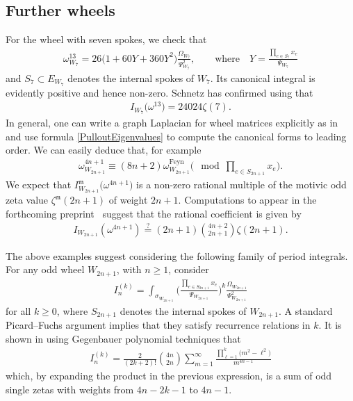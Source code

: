 \documentclass[pdftex]{sigma}%
\numberwithin{equation}{section}
\newcommand{\mm}{\mathfrak{m}}
\newcommand{\0}{\color{blue}{\mathsf{0}}}
\begin{document}
\subsection{Further wheels}
 For the wheel with seven spokes,
we check that
\begin{gather*}
\omega^{13}_{W_7} = 26 \big(1 + 60 Y+ 360 Y^2 \big) \frac{\Omega_{W_7}}{\Psi_{W_7}^2}, \qquad \text{where}\quad Y= \frac{\prod_{e\in S_7} x_e }{\Psi_{W_7}}
\end{gather*}
 and $S_7\subset E_{W_7}$ denotes the internal spokes of $W_7$. Its canonical integral is evidently positive and hence non-zero.
Schnetz has confirmed using \cite{BorinskySchnetz} that
\begin{gather*}
I_{W_7}\big(\omega^{13}\big)= 24024\zeta(7).
\end{gather*}
 In general, one can write a graph Laplacian for wheel matrices explicitly as in \cite[formula~(11.3)]{BEK} and use formula \eqref{PulloutEigenvalues} to compute the canonical forms to leading order. We can easily deduce that, for example
\begin{gather*}
\omega^{4n+1}_{W_{2n+1}} \equiv (8n+2) \omega^{\mathrm{Feyn}}_{W_{2n+1}}
\bigg(\!\!\!\!\!\mod \prod_{e \in S_{2n+1} }x_e \bigg) .
\end{gather*}
We expect that $I^{\mm}_{W_{2n+1}}\big(\omega^{4n+1}\big)$ is a non-zero rational multiple of the motivic odd zeta value $\zeta^{\mathfrak{m}}(2n+1)$ of weight $2n+1$.
Computations to appear in the forthcoming preprint~\cite{BorinskySchnetz} suggest that the rational coefficient is given by
\begin{gather*}
I_{W_{2n+1}}(\omega^{4n+1}) \overset{?}{=} (2n+1) \binom{4n+2}{2n+1}\zeta(2n+1) .
\end{gather*}

\begin{rem}
The above examples suggest considering the following family of period integrals. For any odd wheel $W_{2n+1}$, with $n\geq 1$, consider
\begin{gather*}
I_n^{(k)} = \int_{\sigma_{W_{2n+1}}} \bigg(\frac{\prod_{e\in S_{2n+1}} x_e}{\Psi_{W_{2n+1}}} \bigg)^{\!k} \frac{\Omega_{W_{2n+1}}}{\Psi^2_{W_{2n+1}}}
\end{gather*}
 for all $k \geq 0$, where $S_{2n+1}$ denotes the internal spokes of $W_{2n+1}$. A standard Picard--Fuchs argument implies that they satisfy recurrence relations in $k$.
 It is shown in \cite{BorinskySchnetz} using Gegenbauer polynomial techniques that
 \begin{gather*}
 I^{(k)}_n= \frac{2}{(2k+2)!} \binom{4n}{2n} \sum_{m=1}^{\infty} \frac{ \prod_{\ell=1}^k \big(m^2-\ell^2\big) }{m^{4n-1}}
 \end{gather*}
which, by expanding the product in the previous expression, is a sum of odd single zetas with weights from $4n-2k-1$ to $4n-1$.
 \end{rem}
\end{document}
